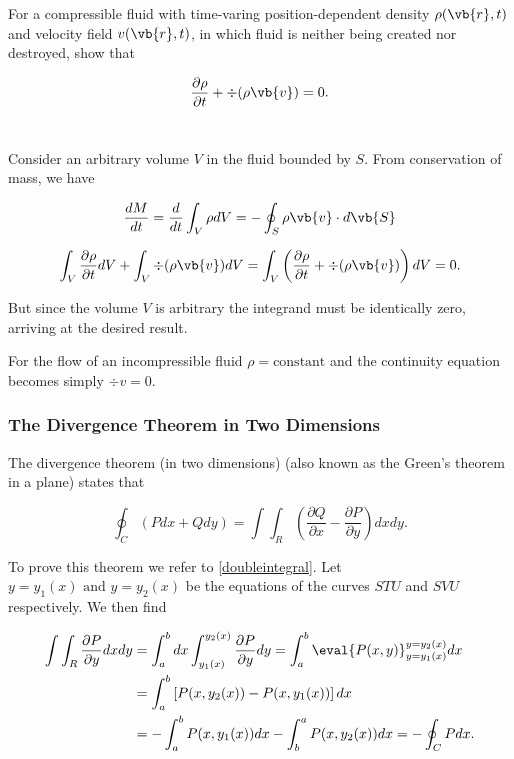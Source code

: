 \documentclass[english,a4paper,12pt]{report}
\begin{document}
{For a compressible fluid with time-varing position-dependent density \(\rho (\vb{r}, t)\) and velocity field \(v(\vb{r}, t)\), in which fluid is neither being created nor destroyed, show that 

\begin{equation}
	\frac{\partial \rho }{\partial t} + \div{(\rho \vb{v} )} = 0.
\end{equation}~
}
{Consider an arbitrary volume \(V\) in the fluid bounded by \(S\). From conservation of mass, we have

\begin{equation}
	\frac{dM}{dt} = \frac{d}{dt} \int_{V}^{} \rho dV = - \oint_{S} \rho \vb{v} \cdot d\vb{S} 
\end{equation}

\begin{equation}
	\int_{V}^{} \frac{\partial \rho }{\partial t}dV + \int_{V}^{} \div{(\rho \vb{v} )} dV = \int_{V}^{} \left( \frac{\partial \rho }{\partial t} + \div{(\rho \vb{v} )}  \right) dV = 0.    
\end{equation}

But since the volume \(V\) is arbitrary the integrand must be identically zero, arriving at the desired result.

For the flow of an incompressible fluid \(\rho = \text{constant} \) and the continuity equation becomes simply \(\div{v} = 0\).~
}

\subsubsection{The Divergence Theorem in Two Dimensions}
The divergence theorem (in two dimensions) (also known as the Green's theorem in a plane) states that 

\begin{equation}
	\oint_{C} (Pdx + Qdy) = \int \int_{R}^{} \left( \frac{\partial Q}{\partial x} - \frac{\partial P}{\partial y}  \right) dxdy.  
\end{equation}

To prove this theorem we refer to \cref{doubleintegral}. Let \(y = y_1 (x) \text { and } y = y_2 (x)\) be the equations of the curves \(STU\) and \(SVU\) respectively. We then find

\begin{equation}
	\begin{aligned} 
	\int \int_{R}^{} \frac{\partial P}{\partial y} dxdy &= \int_{a}^{b} dx \int_{y_1 (x)}^{y_2 (x)} \frac{\partial P}{\partial y} dy = \int_{a}^{b} \eval{P(x,y)}_{y=y_1 (x)}^{y=y_2 (x)} dx \\
	&= \int_{a}^{b} \left[ P(x,y_2 (x)) - P(x,y_1 (x)) \right] dx \\ 
	&= -\int_{a}^{b} P(x,y_1 (x)) dx - \int_{b}^{a} P(x,y_2 (x)) dx = -\oint_{C} Pdx.      
	\end{aligned}      
\end{equation}
\end{document}
